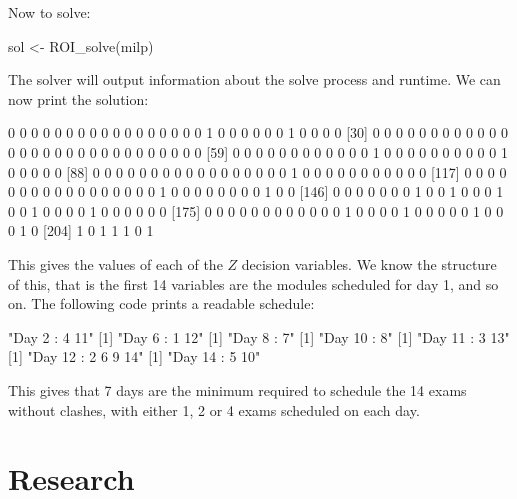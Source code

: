 Now to solve:

\begin{Rin}
sol <- ROI_solve(milp)
\end{Rin}

The solver will output information about the solve process and runtime.
We can now print the solution:


\begin{Rout}
  [1] 0 0 0 0 0 0 0 0 0 0 0 0 0 0 0 0 0 1 0 0 0 0 0 0 1 0 0 0 0
 [30] 0 0 0 0 0 0 0 0 0 0 0 0 0 0 0 0 0 0 0 0 0 0 0 0 0 0 0 0 0
 [59] 0 0 0 0 0 0 0 0 0 0 0 0 1 0 0 0 0 0 0 0 0 0 0 1 0 0 0 0 0
 [88] 0 0 0 0 0 0 0 0 0 0 0 0 0 0 0 0 0 1 0 0 0 0 0 0 0 0 0 0 0
[117] 0 0 0 0 0 0 0 0 0 0 0 0 0 0 0 0 0 1 0 0 0 0 0 0 0 0 1 0 0
[146] 0 0 0 0 0 0 0 1 0 0 1 0 0 0 1 0 0 1 0 0 0 0 1 0 0 0 0 0 0
[175] 0 0 0 0 0 0 0 0 0 0 0 0 1 0 0 0 0 1 0 0 0 0 0 1 0 0 0 1 0
[204] 1 0 1 1 1 0 1
\end{Rout}

This gives the values of each of the $Z$ decision variables.
We know the structure of this, that is the first 14 variables are the modules
scheduled for day 1, and so on.
The following code prints a readable schedule:


\begin{Rout}
[1] "Day 2 : 4 11"
[1] "Day 6 : 1 12"
[1] "Day 8 : 7"
[1] "Day 10 : 8"
[1] "Day 11 : 3 13"
[1] "Day 12 : 2 6 9 14"
[1] "Day 14 : 5 10"
\end{Rout}

This gives that 7 days are the minimum required to schedule the 14 exams without
clashes, with either 1, 2 or 4 exams scheduled on each day.

\section{Research}\label{sec:research}
